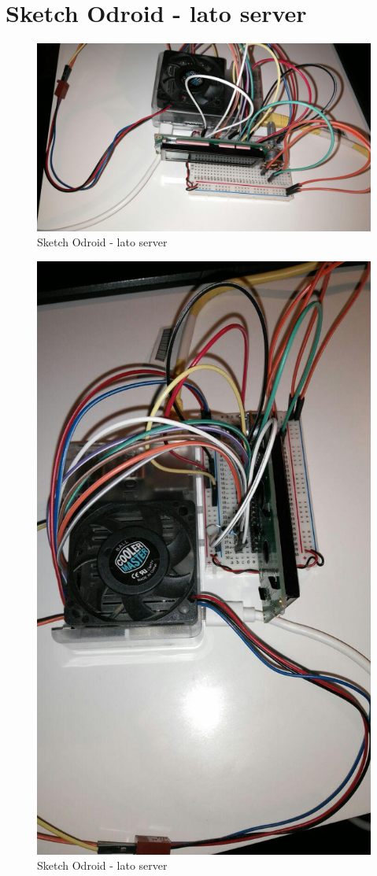 \section{Sketch Odroid - lato server}
\begin{figure}[!ht]
	\centering
	\includegraphics[scale=.3]{img/real3.jpg}
	\caption{Sketch Odroid - lato server}
\end{figure}

\begin{figure}[!ht]
	\centering
	\includegraphics[scale=.3]{img/real4.jpg}
	\caption{Sketch Odroid - lato server}
\end{figure}
